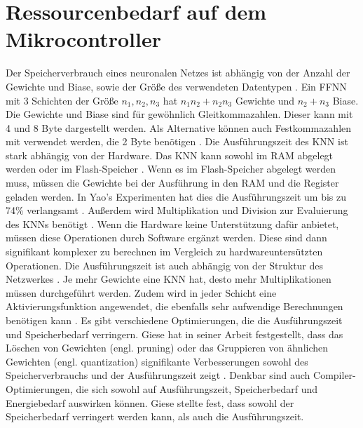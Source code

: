 \section{Ressourcenbedarf auf dem Mikrocontroller}
Der Speicherverbrauch eines neuronalen Netzes ist abhängig von der Anzahl der Gewichte und Biase, sowie der Größe des verwendeten Datentypen \cite{kubikThesis}.
Ein FFNN mit 3 Schichten der Größe $n_1, n_2, n_3$ hat $n_1 n_2 + n_2 n_3$ Gewichte und $n_2 + n_3$ Biase.
Die Gewichte und Biase sind für gewöhnlich Gleitkommazahlen. Dieser kann mit 4 und 8 Byte dargestellt werden.
Als Alternative können auch Festkommazahlen mit verwendet werden, die 2 Byte benötigen \cite{gieseThesis}.
\newline
\newline
Die Ausführungszeit des KNN ist stark abhängig von der Hardware.
Das KNN kann sowohl im RAM abgelegt werden oder im Flash-Speicher \cite{engelhardtThesis}.
Wenn es im Flash-Speicher abgelegt werden muss, müssen die Gewichte bei der Ausführung in den RAM und die Register geladen werden.
In Yao's Experimenten hat dies die Ausführungszeit um bis zu 74\% verlangsamt \cite{yaoThesis}.
\newline
\newline
Außerdem wird Multiplikation und Division zur Evaluierung des KNNs benötigt \cite{engelhardtThesis}.
Wenn die Hardware keine Unterstützung dafür anbietet, müssen diese Operationen durch Software ergänzt werden.
Diese sind dann signifikant komplexer zu berechnen im Vergleich zu hardwareuntersützten Operationen.
\newline
\newline
Die Ausführungszeit ist auch abhängig von der Struktur des Netzwerkes \cite{gieseThesis}.
Je mehr Gewichte eine KNN hat, desto mehr Multiplikationen müssen durchgeführt werden.
Zudem wird in jeder Schicht eine Aktivierungsfunktion angewendet, die ebenfalls sehr aufwendige Berechnungen benötigen kann \cite{venzkeArticle}.
\newline
\newline
Es gibt verschiedene Optimierungen, die die Ausführungszeit und Speicherbedarf verringern.
Giese hat in seiner Arbeit festgestellt, dass das Löschen von Gewichten (engl. pruning) oder das Gruppieren von ähnlichen Gewichten (engl. quantization)
signifikante Verbesserungen sowohl des Speicherverbrauchs und der Ausführungszeit zeigt \cite{gieseThesis}.
Denkbar sind auch Compiler-Optimierungen, die sich sowohl auf Ausführungszeit, Speicherbedarf und Energiebedarf auswirken können.
Giese stellte fest, dass sowohl der Speicherbedarf verringert werden kann, als auch die Ausführungszeit.
